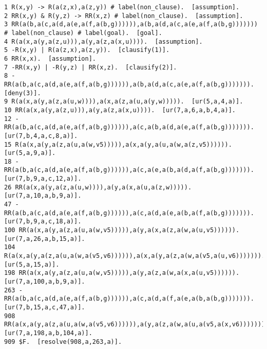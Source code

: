 \begin{verbatim}
1 R(x,y) -> R(a(z,x),a(z,y)) # label(non_clause).  [assumption].
2 RR(x,y) & R(y,z) -> RR(x,z) # label(non_clause).  [assumption].
3 RR(a(b,a(c,a(d,a(e,a(f,a(b,g)))))),a(b,a(d,a(c,a(e,a(f,a(b,g))))))) # label(non_clause) # label(goal).  [goal].
4 R(a(x,a(y,a(z,u))),a(y,a(z,a(x,u)))).  [assumption].
5 -R(x,y) | R(a(z,x),a(z,y)).  [clausify(1)].
6 RR(x,x).  [assumption].
7 -RR(x,y) | -R(y,z) | RR(x,z).  [clausify(2)].
8 -RR(a(b,a(c,a(d,a(e,a(f,a(b,g)))))),a(b,a(d,a(c,a(e,a(f,a(b,g))))))).  [deny(3)].
9 R(a(x,a(y,a(z,a(u,w)))),a(x,a(z,a(u,a(y,w))))).  [ur(5,a,4,a)].
10 RR(a(x,a(y,a(z,u))),a(y,a(z,a(x,u)))).  [ur(7,a,6,a,b,4,a)].
12 -RR(a(b,a(c,a(d,a(e,a(f,a(b,g)))))),a(c,a(b,a(d,a(e,a(f,a(b,g))))))).  [ur(7,b,4,a,c,8,a)].
15 R(a(x,a(y,a(z,a(u,a(w,v5))))),a(x,a(y,a(u,a(w,a(z,v5)))))).  [ur(5,a,9,a)].
18 -RR(a(b,a(c,a(d,a(e,a(f,a(b,g)))))),a(c,a(e,a(b,a(d,a(f,a(b,g))))))).  [ur(7,b,9,a,c,12,a)].
26 RR(a(x,a(y,a(z,a(u,w)))),a(y,a(x,a(u,a(z,w))))).  [ur(7,a,10,a,b,9,a)].
47 -RR(a(b,a(c,a(d,a(e,a(f,a(b,g)))))),a(c,a(d,a(e,a(b,a(f,a(b,g))))))).  [ur(7,b,9,a,c,18,a)].
100 RR(a(x,a(y,a(z,a(u,a(w,v5))))),a(y,a(x,a(z,a(w,a(u,v5)))))).  [ur(7,a,26,a,b,15,a)].
104 R(a(x,a(y,a(z,a(u,a(w,a(v5,v6)))))),a(x,a(y,a(z,a(w,a(v5,a(u,v6))))))).  [ur(5,a,15,a)].
198 RR(a(x,a(y,a(z,a(u,a(w,v5))))),a(y,a(z,a(w,a(x,a(u,v5)))))).  [ur(7,a,100,a,b,9,a)].
263 -RR(a(b,a(c,a(d,a(e,a(f,a(b,g)))))),a(c,a(d,a(f,a(e,a(b,a(b,g))))))).  [ur(7,b,15,a,c,47,a)].
908 RR(a(x,a(y,a(z,a(u,a(w,a(v5,v6)))))),a(y,a(z,a(w,a(u,a(v5,a(x,v6))))))).  [ur(7,a,198,a,b,104,a)].
909 $F.  [resolve(908,a,263,a)].
\end{verbatim}
